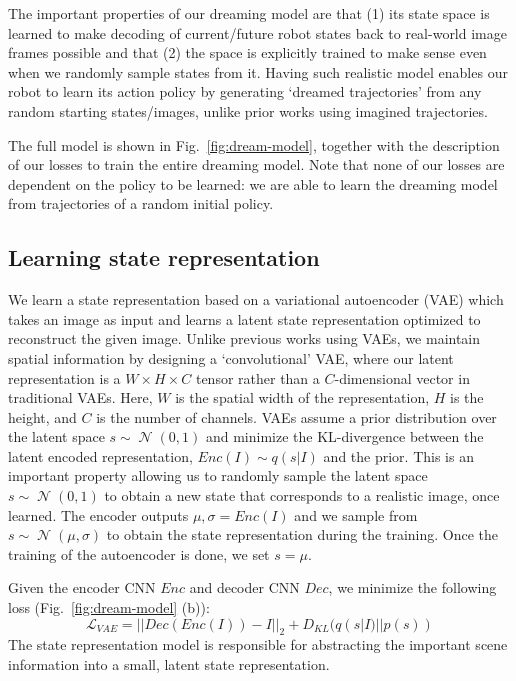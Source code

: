 \documentclass[letterpaper, 10 pt, conference]{ieeeconf}
\DeclareMathOperator{\N}{\mathcal{N}}
\begin{document}
The important properties of our dreaming model are that (1) its state space is learned to make decoding of current/future robot states back to real-world image frames possible and that (2) the space is explicitly trained to make sense even when we randomly sample states from it. Having such realistic model enables our robot to learn its action policy by generating `dreamed trajectories' from any random starting states/images, unlike prior works using imagined trajectories.%








The full model is shown in Fig.~\ref{fig:dream-model}, together with the description of our losses to train the entire dreaming model. Note that none of our losses are dependent on the policy to be learned: we are able to learn the dreaming model from trajectories of a random initial policy.




\subsection{Learning state representation}


We learn a state representation based on a variational autoencoder (VAE) \cite{kingma2014auto}
which takes an image as input and learns a latent state representation optimized to reconstruct the given image. Unlike previous works using VAEs, we maintain spatial information by designing a `convolutional' VAE, where our latent representation is a $W\times H\times C$ tensor rather than a $C$-dimensional vector in traditional VAEs. Here, $W$ is the spatial width of the representation, $H$ is the height, and $C$ is the number of channels. VAEs assume a prior distribution over the latent space $s \sim \N(0,1)$ and minimize the KL-divergence between the latent encoded representation, $Enc(I) \sim q(s|I)$ and the prior. This is an important property allowing us to randomly sample the latent space $s\sim \N(0,1)$ to obtain a new state that corresponds to a realistic image, once learned. The encoder outputs $\mu,\sigma = Enc(I)$ and we sample from $s\sim\N (\mu,\sigma)$ to obtain the state representation during the training. Once the training of the autoencoder is done, we set $s=\mu$.

Given the encoder CNN $Enc$ and decoder CNN $Dec$, we minimize the following loss (Fig.~\ref{fig:dream-model} (b)):
\begin{equation}
    \label{eq:vae}
    \mathcal{L}_{VAE} = ||Dec(Enc(I)) - I||_2 + D_{KL}(q(s|I)||p(s))
\end{equation}
The state representation model is responsible for abstracting the important scene information into a small, latent state representation. 
\end{document}
